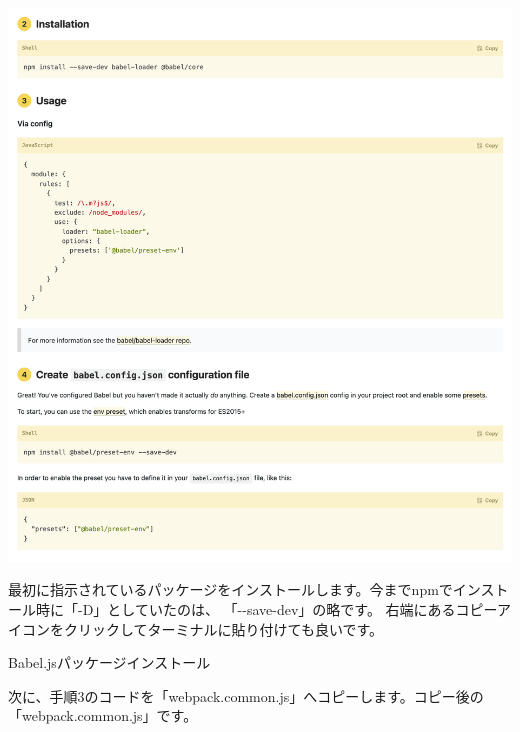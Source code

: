 \begin{reviewimage}%
\includegraphics[width=1.0\maxwidth]{./images/02-create-react-app/babel03.png}%
\label{image:02-create-react-app:babel03}
\end{reviewimage}

\clearpage


最初に指示されているパッケージをインストールします。今までnpmでインストール時に「{-}D」としていたのは、
「{-}{-}save{-}dev」の略です。
右端にあるコピーアイコンをクリックしてターミナルに貼り付けても良いです。

\def\startercodeblockfontsize{}
\begin{starterterminal}[]{Babel.jsパッケージインストール}\end{starterterminal}

次に、手順3のコードを「webpack.common.js」へコピーします。コピー後の「webpack.common.js」です。

